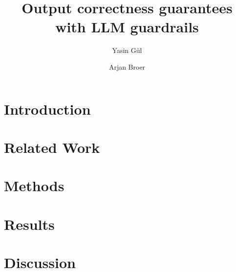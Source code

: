 \documentclass[a4paper,doc,natbib]{apa6}
\title{Output correctness guarantees with LLM guardrails}
\author{Yasin G\"{u}l \and Arjan Broer}
\affiliation{Open University of the Netherlands}
\begin{document}
    \maketitle

\section{Introduction}
    

\section{Related Work}
    

\section{Methods}
    

\section{Results}
    

\section{Discussion}
    


\end{document}
